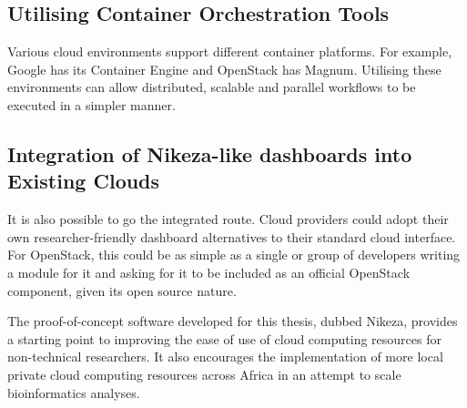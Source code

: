 \subsection{Utilising Container Orchestration Tools}
Various cloud environments support different container platforms. For example, Google has its Container Engine and OpenStack has Magnum. Utilising these environments can allow distributed, scalable and parallel workflows to be executed in a simpler manner.

\subsection{Integration of Nikeza-like dashboards into Existing Clouds}
It is also possible to go the integrated route. Cloud providers could adopt their own researcher-friendly dashboard alternatives to their standard cloud interface. For OpenStack, this could be as simple as a single or group of developers writing a module for it and asking for it to be included as an official OpenStack component, given its open source nature.

The proof-of-concept software developed for this thesis, dubbed Nikeza, provides a starting point to improving the ease of use of cloud computing resources for non-technical researchers. It also encourages the implementation of more local private cloud computing resources across Africa in an attempt to scale bioinformatics analyses.
